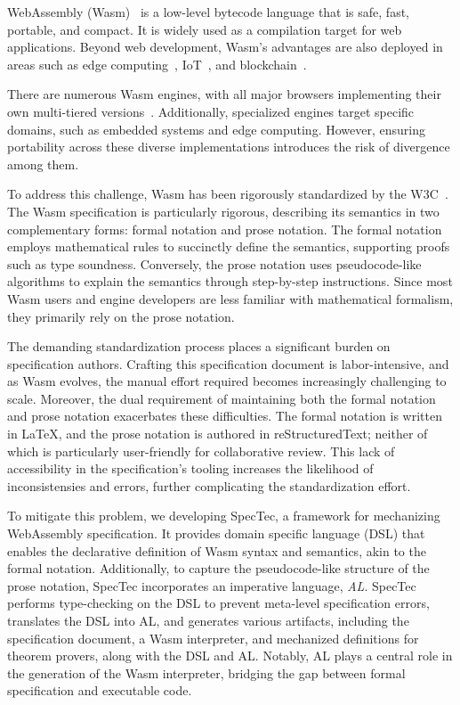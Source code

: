 WebAssembly (Wasm)~\cite{wasm} is a low-level bytecode language that is safe, fast,
portable, and compact.
It is widely used as a compilation target for web applications.
Beyond web development, Wasm's advantages are also deployed in areas such as
edge computing~\cite{wasm-edge}, IoT~\cite{wasm-iot}, and
blockchain~\cite{wasm-block}.


There are numerous Wasm engines, with all major browsers implementing their own
multi-tiered versions~\cite{v8, spidermonkey, webkit}.
Additionally, specialized engines target specific domains, such as embedded
systems and edge computing.
However, ensuring portability across these diverse implementations introduces
the risk of divergence among them.


To address this challenge, Wasm has been rigorously standardized by the
W3C~\cite{wasm-w3c}.
The Wasm specification is particularly rigorous, describing its semantics in
two complementary forms: formal notation and prose notation.
The formal notation employs mathematical rules to succinctly define the
semantics, supporting proofs such as type soundness.
Conversely, the prose notation uses pseudocode-like algorithms to explain the
semantics through step-by-step instructions.
Since most Wasm users and engine developers are less familiar with mathematical
formalism, they primarily rely on the prose notation.


The demanding standardization process places a significant burden on
specification authors.
Crafting this specification document is labor-intensive, and as Wasm evolves,
the manual effort required becomes increasingly challenging to scale.
Moreover, the dual requirement of maintaining both the formal notation and
prose notation exacerbates these difficulties.
The formal notation is written in LaTeX, and the prose notation is authored
in reStructuredText; neither of which is particularly user-friendly for
collaborative review.
This lack of accessibility in the specification's tooling increases the
likelihood of inconsistensies and errors, further complicating the
standardization effort.


To mitigate this problem, we  developing SpecTec, a framework for
mechanizing WebAssembly specification.
It provides domain specific language (DSL) that enables the declarative
definition of Wasm syntax and semantics, akin to the formal notation.
Additionally, to capture the pseudocode-like structure of the prose notation,
SpecTec incorporates an imperative language, \textit{AL}.
SpecTec performs type-checking on the DSL to prevent meta-level specification
errors, translates the DSL into AL, and generates various artifacts, including
the specification document, a Wasm interpreter, and mechanized definitions for
theorem provers, along with the DSL and AL.
Notably, AL plays a central role in the generation of the Wasm interpreter,
bridging the gap between formal specification and executable code.


